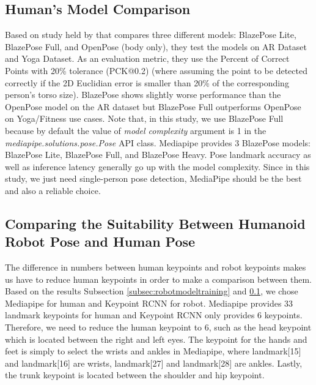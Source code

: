 \subsection{Human's Model Comparison}
\label{subsec:humanmodelcomparison}

Based on study held by \citet{bazarevsky2020} that compares three different models: BlazePose Lite, BlazePose Full, and OpenPose (body only), they test the models on AR Dataset and Yoga Dataset. As an evaluation metric, they use the Percent of Correct Points with 20\% tolerance (PCK@0.2)
(where assuming the point to be detected correctly if the 2D Euclidian error is smaller than 20\% of the corresponding person's torso size). BlazePose shows slightly worse performance than the OpenPose model on the AR dataset but BlazePose Full outperforms OpenPose on Yoga/Fitness use cases.
Note that, in this study, we use BlazePose Full because by default the value of \emph{model complexity} argument is 1 in the \emph{mediapipe.solutions.pose.Pose} API class. Mediapipe provides 3 BlazePose models: BlazePose Lite, BlazePose Full, and BlazePose Heavy. Pose landmark accuracy as well
as inference latency generally go up with the model complexity.
Since in this study, we just need single-person pose detection, MediaPipe should be the best and also a reliable choice.


\subsection{Comparing the Suitability Between Humanoid Robot Pose and Human Pose}
\label{subsec:comparingsuitability}

The difference in numbers between human keypoints and robot keypoints makes us have to reduce human keypoints in order to make a comparison between them.
Based on the results Subsection \ref{subsec:robotmodeltraining} and \ref{subsec:humanmodelcomparison}, we chose Mediapipe for human and Keypoint RCNN for robot.
Mediapipe provides 33 landmark keypoints for human and Keypoint RCNN only provides 6 keypoints.
Therefore, we need to reduce the human keypoint to 6, such as the head keypoint which is located between the right and left eyes.
The keypoint for the hands and feet is simply to select the wrists and ankles in Mediapipe, where landmark[15] and landmark[16] are wrists, landmark[27] and landmark[28] are ankles.
Lastly, the trunk keypoint is located between the shoulder and hip keypoint.

